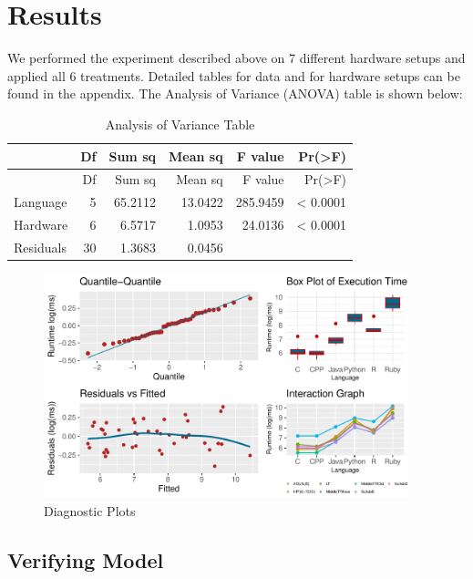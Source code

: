 \documentclass[12pt,halfline,a4paper,]{ouparticle}
\begin{document}
\section{Results}\label{results}

We performed the experiment described above on 7 different hardware
setups and applied all 6 treatments. Detailed tables for data and for
hardware setups can be found in the appendix. The Analysis of Variance
(ANOVA) table is shown below:

\begin{longtable}[]{@{}lrrrrr@{}}
\caption{Analysis of Variance Table}\tabularnewline
\toprule\noalign{}
& Df & Sum sq & Mean sq & F value & Pr(\textgreater F) \\
\midrule\noalign{}
\endfirsthead
\toprule\noalign{}
& Df & Sum sq & Mean sq & F value & Pr(\textgreater F) \\
\midrule\noalign{}
\endhead
\bottomrule\noalign{}
\endlastfoot
Language & 5 & 65.2112 & 13.0422 & 285.9459 & \textless{} 0.0001 \\
Hardware & 6 & 6.5717 & 1.0953 & 24.0136 & \textless{} 0.0001 \\
Residuals & 30 & 1.3683 & 0.0456 & & \\
\end{longtable}

\begin{figure}[H]

{\centering \includegraphics[width=400px]{backup_files/figure-latex/figAnova-1} 

}

\caption{Diagnostic Plots}\label{fig:figAnova}
\end{figure}

\subsection{Verifying Model}\label{verifying-model}
\end{document}
